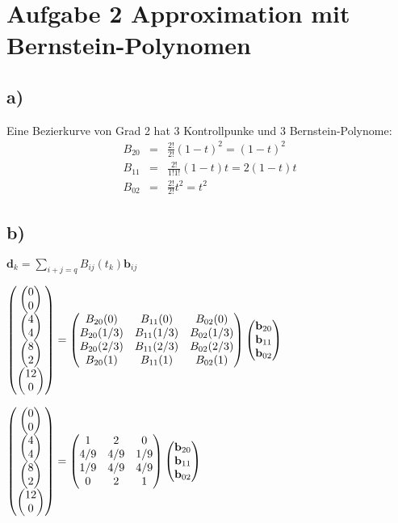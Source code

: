 
\section*{Aufgabe 2 Approximation mit Bernstein-Polynomen}

\subsection*{a)}
Eine Bezierkurve von Grad 2 hat 3 Kontrollpunke und 3 Bernstein-Polynome:
\begin{eqnarray}
    B_{20}&=& \frac{2!}{2!}\left(1-t \right)^2 = \left(1-t \right)^2\\
    B_{11}&=& \frac{2!}{1!1!}\left(1-t \right)t = 2 \left(1-t \right)t  \\
    B_{02}&=& \frac{2!}{2!} t^2 = t^2  
\end{eqnarray}




\subsection*{b)}

$\mathbf{d}_k = \sum_{i+j=q} B_{ij}(t_k) \mathbf{b}_{ij}$

$\left( \begin{matrix} \left( \begin{matrix}0 \\ 0 \end{matrix}\right) \\ \left( \begin{matrix}4 \\ 4 \end{matrix}\right) \\ \left( \begin{matrix}8 \\ 2 \end{matrix}\right) \\ \left( \begin{matrix}12 \\ 0 \end{matrix}\right)\end{matrix}\right) = 
\left( \begin{matrix} 
    B_{20}(0) & B_{11}(0) &B_{02}(0) \\
    B_{20}(1/3) & B_{11}(1/3) &B_{02}(1/3) \\
    B_{20}(2/3) & B_{11}(2/3) &B_{02}(2/3) \\
    B_{20}(1) & B_{11}(1) &B_{02}(1) \\
\end{matrix} \right)  \left( \begin{matrix} \mathbf{b}_{20} \\ \mathbf{b}_{11} \\ \mathbf{b}_{02} \end{matrix}\right)$


$\left( \begin{matrix} \left( \begin{matrix}0 \\ 0 \end{matrix}\right) \\ \left( \begin{matrix}4 \\ 4 \end{matrix}\right) \\ \left( \begin{matrix}8 \\ 2 \end{matrix}\right) \\ \left( \begin{matrix}12 \\ 0 \end{matrix}\right)\end{matrix}\right) = 
\left( \begin{matrix} 
    1 & 2 &0 \\
    4/9 & 4/9 &1/9 \\
    1/9 & 4/9 & 4/9 \\
    0 & 2 &1  \\
\end{matrix} \right)  \left( \begin{matrix} \mathbf{b}_{20} \\ \mathbf{b}_{11} \\ \mathbf{b}_{02} \end{matrix}\right)$

